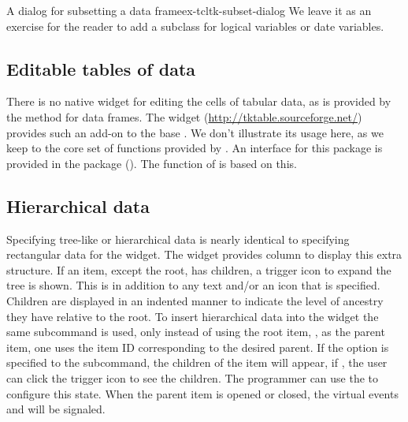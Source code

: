 \begin{example}{A dialog for subsetting a data frame}{ex-tcltk-subset-dialog}
We leave it as an exercise for the reader to add a subclass for
logical variables or date variables.

\end{example}




\subsection{Editable tables of data}
\label{sec:editable-tables-data}

There is no native widget for editing the cells of tabular data, as is
provided by the  method for data frames. The
 widget (\url{http://tktable.sourceforge.net/}) provides
such an add-on to the base \TK. We don't illustrate its usage here, as
we keep to the core set of functions provided by \TK.  An interface
for this \TCL\/ package is provided in the  package
().  The  function of 
is based on this.



\subsection{Hierarchical data}

Specifying tree-like or hierarchical data is nearly identical to
specifying rectangular data for the  widget.  The
widget provides column  to display this extra structure. If
an item, except the root, has children, a trigger icon to expand the
tree is shown. This is in addition to any text and/or an icon that is
specified. Children are displayed in an indented manner to indicate
the level of ancestry they have relative to the root.  To insert
hierarchical data into the widget the same
 subcommand is used, only instead of
using the root item, \qcode{}, as the parent item, one uses the item
ID corresponding to the desired parent. If the option 
is specified to the  subcommand, the children of the item
will appear, if , the user can click the trigger icon to
see the children. The programmer can use the
 to configure this state. When the
parent item is opened or closed, the virtual events
 and  will be
signaled.


